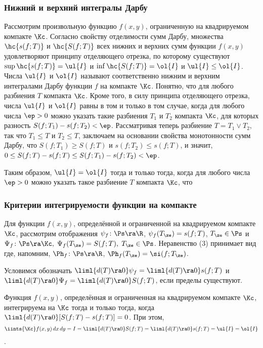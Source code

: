 \documentclass[a4paper]{article}
\begin{document}
\subsubsection{Нижний и верхний интегралы Дарбу}

Рассмотрим произвольную функцию $f(x,y)$, ограниченную на
квадрируемом компакте $\Kc$. Согласно свойству отделимости сумм
Дарбу, множества $\hc{s(f;T)}$ и $\hc{S(f;T)}$ всех нижних и верхних
сумм функции $f(x,y)$ удовлетворяют принципу отделяющего отрезка, по
которому существуют $\sup\hc{s(f;T)}=\ul{I}$ и
$\inf\hc{S(f;T)}=\ol{I}$ и $\ul{I}\le\ol{I}$. Числа $\ul{I}$ и
$\ol{I}$ называют соответственно нижним и верхним интегралами Дарбу
функции $f$ на компакте $\Kc$. Понятно, что  для любого разбиения $T$ компакта $\Kc$.
Кроме того, в силу принципа отделяющего отрезка, числа $\ul{I}$ и
$\ol{I}$ равны в том и только в том случае, когда для любого числа
$\ep>0$ можно указать такие разбиения $T_1$ и $T_2$ компакта $\Kc$,
для которых разность $S(f;T_1)-s(f;T_2)<\ep$. Рассматривая теперь
разбиение $T=T_1\vee T_2$, так что $T_1\le T$ и $T_2\le T$,
заключаем на основании свойства монотонности сумм Дарбу, что
$S(f;T_1)\ge S(f;T)$ и $s(f;T_2)\le s(f;T)$, и значит, $0\le
S(f;T)-s(f;T)\le S(f;T_1)-s(f;T_2)<\ep$.

Таким образом, $\ul{I}=\ol{I}$ тогда и только тогда, когда для
любого числа $\ep>0$ можно указать такое разбиение $T$ компакта
$\Kc$, что 

\subsubsection{Критерии интегрируемости функции на компакте}
\label{136} Для функции $f(x,y)$, определённой и ограниченной на
квадрируемом компакте $\Kc$, рассмотрим отображения
$\psi_f\colon\Ps\ra\R$, $\psi_f(T_{\ze})=s(f;T)$, $T_{\ze}\in\Ps$ и
$\Psi_f\colon\Ps\ra\Kc, \; \Psi_f(T_{\ze})=S(f;T), \;
T_{\ze}\in\Ps$. Неравенство (3) принимает вид
 где, напомним, $\Ph_f\colon \Ps\ra\R$,
$\Ph_f(T_{\ze})=\si(f;T_{\ze})$.

Условимся обозначать $\liml{d(T)\ra0}\psi_f = \liml{d(T)\ra0}
s(f;T)$ и $\liml{d(T)\ra0} \Psi_f = \liml{d(T)\ra0} S(f;T)$, если
пределы существуют.

\begin{theorem}
\label{thm361} Функция $f(x,y)$, определённая и ограниченная на
квадрируемом компакте $\Kc$, интегрируема на $\Kc$ тогда и только
тогда, когда $\liml{d(T)\ra0} [S(f;T)-s(f;T)]=0$. При этом,
$$\iints{\Kc} f(x,y)\,dx\,dy=I=\liml{d(T)\ra0} S(f;T) =
\liml{d(T)\ra0} s(f;T)=\ul{I}=\ol{I}$$.
\end{theorem}
\end{document}
